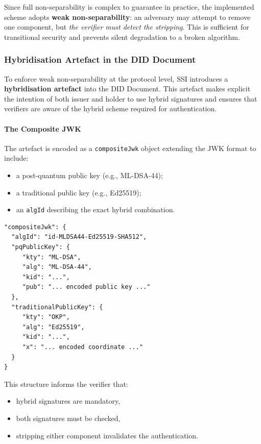 \noindent
Since full non-separability is complex to guarantee in practice, the implemented scheme adopts \textbf{weak non-separability}: an adversary may attempt to remove one component, but \emph{the verifier must detect the stripping}. This is sufficient for transitional security and prevents silent degradation to a broken algorithm.

\subsubsection {Hybridisation Artefact in the DID Document}
To enforce weak non-separability at the protocol level, SSI introduces a \textbf{hybridisation artefact} into the DID Document. This artefact makes explicit the intention of both issuer and holder to use hybrid signatures and ensures that verifiers are aware of the hybrid scheme required for authentication.

\paragraph*{The Composite JWK}
The artefact is encoded as a \texttt{compositeJwk} object extending the JWK format to include:
\begin{itemize}
    \item a post-quantum public key (e.g., ML-DSA-44);
    \item a traditional public key (e.g., Ed25519);
    \item an \texttt{algId} describing the exact hybrid combination.
\end{itemize}

\begin{verbatim}
"compositeJwk": {
  "algId": "id-MLDSA44-Ed25519-SHA512",
  "pqPublicKey": {
     "kty": "ML-DSA",
     "alg": "ML-DSA-44",
     "kid": "...",
     "pub": "... encoded public key ..."
  },
  "traditionalPublicKey": {
     "kty": "OKP",
     "alg": "Ed25519",
     "kid": "...",
     "x": "... encoded coordinate ..."
  }
}
\end{verbatim}

This structure informs the verifier that:
\begin{itemize}
    \item hybrid signatures are mandatory,
    \item both signatures must be checked,
    \item stripping either component invalidates the authentication.
\end{itemize}

